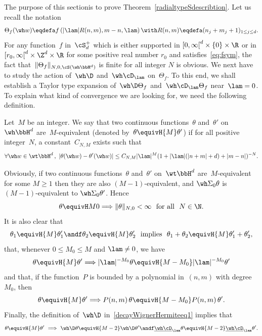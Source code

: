 The purpose of this sectionis to prove Theorem~\ref{radialtypeSdescribtion}. Let us recall the notation
\[
\Theta_f(\wh w)\eqdefa f\left(|\lam|R(n,m),m-n,\lam\right)\with R(n,m)\eqdefa (n_j+m_j+1)_{1\leq j\leq d}.
\]
For any function~$f$ in~$\cS_d^+$ which is either supported in $[0,\infty\mathclose{[}^d\times\{0\}\times\R$ or in $[r_0,\infty\mathclose{[}^d\times\Z^d\times\R$ for some positive real number $r_0$ and satisfies~\eqref{eq:fsym}, the fact that~$\|\Theta_f\|_{N,0,\cS(\wh \bbH ^{d})}$ is finite for all integer $N$ is obvious. We next have to study the action of~$\wh \D$ and~$\wh\cD_\lam$ on~$\Theta_f$. To this end, we shall establish a Taylor type expansion of~$\wh \D \Theta_f$ and~$\wh\cD_\lam\Theta_f$ near~$\lam=0$. To explain what kind of convergence we are looking for, we need the following definition.

\begin{defi}\label{definequivonHtilde}
Let~$M$ be an integer. We say that two continuous functions~$\theta$ and~$\theta'$ on~$\wh \bbH^d$ are~$M$-equivalent (denoted by~$\theta\equivH{M} \theta'$) if for all positive integer~$N$, a constant~$C_{N,M}$ exists such that
\[
\forall \wh w\in \wt \bbH^d\,,\ |\theta(\wh w)-\theta'(\wh w)| \leq C_{N,M} |\lam|^M (1+|\lam|(|n+m|+d)+|m-n|)^{-N}.
\]
\end{defi}

Obviously, if two continuous functions~$\theta$ and~$\theta'$ on~$\wt \bbH^d$ are~$M$-equivalent for some $M\geq1$ then they are also $(M\!-\!1)$-equivalent, and $\wh\Sigma_0\theta$ is $(M\!-\!1)$-equivalent to $\wh\Sigma_0\theta'$. Hence
\begin{equation}\label{equivonHtildeeq0}
\theta\equivH M 0\Longrightarrow \|\theta\|_{N,0} <\infty\ \hbox{ for all }\ N\in\N.
\end{equation}
It is also clear that
\begin{equation}
\theta_1\equivH {M} \theta_1'\andf
\theta_2\equivH {M} \theta'_2
\ \hbox{ implies }\
\theta_1+\theta_2\equivH {M} \theta'_1+\theta'_2,
\end{equation}
that, whenever $0\leq M_0\leq M$ and $\lam\not=0$, we have
\begin{equation}\label{equivonHtildeeq1}
\theta\equivH {M} \theta' \Longrightarrow |\lam|^{-M_0} \theta\equivH {M-M_0} |\lam|^{-M_0} \theta'
\end{equation}
and that, if the function~$P$ is bounded by a polynomial in~$(n,m)$ with degree~$M_0$, then
\begin{equation}\label{equivonHtildeeq2}
\theta\equivH {M} \theta' \Longrightarrow P(n,m)\,\theta\equivH {M-M_0} P(n,m)\,\theta'.
\end{equation}
Finally, the definition of~$\wh \D$ in~\eqref{decayWignerHermiteeq1} implies that
\begin{equation}\label{equivonHtildeeq3}
\theta\equivH {M} \theta'\ \Longrightarrow \ \wh \D \theta\equivH {M-2} \wh\D\theta'
\andf \underline{\wh\cD}_\lam \theta\equivH {M-2} \underline{\wh\cD}_\lam \theta'.
\end{equation}

